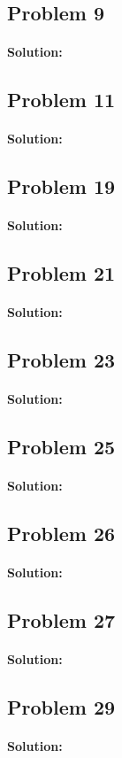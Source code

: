 \documentclass[11pt, notitlepage]{report}
\newenvironment{solution}{\paragraph{Solution:}}{\hfill}
\begin{document}
\subsection{Problem 9}
\begin{solution}
\end{solution}
\subsection{Problem 11}
\begin{solution}
\end{solution}
\subsection{Problem 19}
\begin{solution}
\end{solution}
\subsection{Problem 21}
\begin{solution}
\end{solution}
\subsection{Problem 23}
\begin{solution}
\end{solution}
\subsection{Problem 25}
\begin{solution}
\end{solution}
\subsection{Problem 26}
\begin{solution}
\end{solution}
\subsection{Problem 27}
\begin{solution}
\end{solution}
\subsection{Problem 29}
\begin{solution}
\end{solution}
\end{document}
